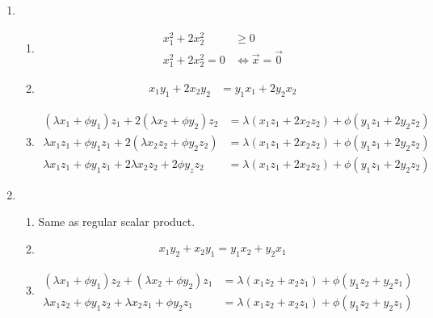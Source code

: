 \documentclass{article}
\begin{document}
\begin{enumerate}
    \item \begin{enumerate}[label=(\roman*)]
        \item \begin{align*}
            x_1^2 + 2x_2^2 &\geq 0 \\
            x_1^2 + 2x_2^2 = 0 &\Leftrightarrow \vec{x} = \vec{0}
        \end{align*}

        \item \begin{align*}
            x_1y_1 + 2x_2y_2 & = y_1x_1 + 2y_2x_2
        \end{align*}

        \item \begin{align*}
            (\lambda x_1 + \phi y_1)z_1 + 2(\lambda x_2 + \phi y_2)z_2 &= \lambda(x_1z_1 + 2x_2z_2) + \phi(y_1z_1 + 2y_2z_2) \\
        \lambda x_1 z_1 + \phi y_1 z_1 + 2(\lambda x_2 z_2 + \phi y_2z_2) &= \lambda(x_1z_1 + 2x_2z_2) + \phi(y_1z_1 + 2y_2z_2) \\
        \lambda x_1 z_1 + \phi y_1 z_1 + 2\lambda x_2 z_2 + 2\phi y_z z_2 &= \lambda(x_1z_1 + 2x_2z_2) + \phi(y_1z_1 + 2y_2z_2)
        \end{align*}
    \end{enumerate}

    \item \begin{enumerate}[label=(\roman*)]
        \item Same as regular scalar product.
        
        \item \begin{align*}
            x_1y_2 + x_2y_1 = y_1x_2 + y_2x_1
        \end{align*}

        \item \begin{align*}
            (\lambda x_1 + \phi y_1)z_2 + (\lambda x_2 + \phi y_2)z_1 &= \lambda(x_1z_2 + x_2z_1) + \phi(y_1z_2 + y_2z_1) \\
            \lambda x_1 z_2 + \phi y_1 z_2 + \lambda x_2 z_1 + \phi y_2 z_1 &= \lambda(x_1z_2 + x_2z_1) + \phi(y_1z_2 + y_2z_1)
        \end{align*}
    \end{enumerate}


\end{enumerate}
\end{document}
